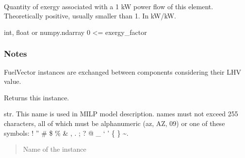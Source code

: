 \documentclass[letterpaper,10pt,english]{sphinxmanual}
\begin{document}
\begin{fulllineitems}
\begin{savenotes}
\begin{tabulary}{\linewidth}[t]{}
\\
\hline
\end{tabulary}
\par
\sphinxattableend\end{savenotes}

\begin{fulllineitems}
\label{\detokenize{generated/tamos.element.FuelVector:tamos.element.FuelVector.exergy_factor}}
\pysigstartsignatures
{}
\pysigstopsignatures
\sphinxAtStartPar
Quantity of exergy associated with a 1 kW power flow of this element.
Theoretically positive, usually smaller than 1. In kW/kW.

\sphinxAtStartPar
int, float or numpy.ndarray
0 \textless{}= exergy\_factor
\subsubsection*{Notes}

\sphinxAtStartPar
FuelVector instances are exchanged between components considering their LHV value.

\end{fulllineitems}


\begin{fulllineitems}
\label{\detokenize{generated/tamos.element.FuelVector:tamos.element.FuelVector.get_vectors}}
\pysigstartsignatures
{}
\pysigstopsignatures
\sphinxAtStartPar
Returns this instance.

\end{fulllineitems}


\begin{fulllineitems}
\label{\detokenize{generated/tamos.element.FuelVector:tamos.element.FuelVector.name}}
\pysigstartsignatures
{}
\pysigstopsignatures
\sphinxAtStartPar
str.
This name is used in MILP model description.
names must not exceed 255 characters,
all of which must be alphanumeric (a\sphinxhyphen{}z, A\sphinxhyphen{}Z, 0\sphinxhyphen{}9) or one of these symbols:
! ” \# \$ \% \& , . ; ? @ \_ ‘ ’ \{ \} \textasciitilde{}.
\begin{quote}\begin{description}
\sphinxAtStartPar
Name of the instance


\end{description}
\end{quote}
\end{fulllineitems}
\end{fulllineitems}
\end{document}

